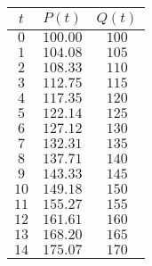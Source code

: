 \begin{tabular}{ccc} \toprule
$t$  & $P(t)$   & $Q(t)$ \\\midrule
$0$  & $100.00$ & $100$  \\
$1$  & $104.08$ & $105$  \\
$2$  & $108.33$ & $110$  \\
$3$  & $112.75$ & $115$  \\
$4$  & $117.35$ & $120$  \\
$5$  & $122.14$ & $125$  \\
$6$  & $127.12$ & $130$  \\
$7$  & $132.31$ & $135$  \\
$8$  & $137.71$ & $140$  \\
$9$  & $143.33$ & $145$  \\
$10$ & $149.18$ & $150$  \\
$11$ & $155.27$ & $155$  \\
$12$ & $161.61$ & $160$  \\
$13$ & $168.20$ & $165$  \\
$14$ & $175.07$ & $170$  \\\bottomrule
\end{tabular}
